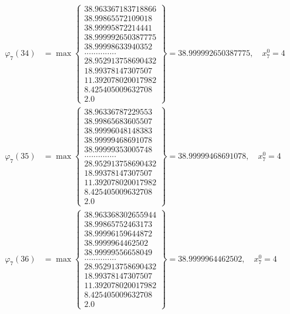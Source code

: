 \documentclass{article}
\begin{document}
\begin{align*}
  
  
  
\varphi_{7}(34) &= \max \left\{ \begin{array}{c}
38.963367183718866 \\
 38.99865572109018 \\
 38.99995872214441 \\
 38.999992650387775 \\
 38.99998633940352 \\
 .............. \\
 28.952913758690432 \\
 18.99378147307507 \\
 11.392078020017982 \\
 8.425405009632708 \\
 2.0
\end{array} \right\} = 38.999992650387775, \quad x_{7}^0 = 4\\
  
  
  
  
\varphi_{7}(35) &= \max \left\{ \begin{array}{c}
38.96336787229553 \\
 38.99865683605507 \\
 38.99996048148383 \\
 38.99999468691078 \\
 38.99999353005748 \\
 .............. \\
 28.952913758690432 \\
 18.99378147307507 \\
 11.392078020017982 \\
 8.425405009632708 \\
 2.0
\end{array} \right\} = 38.99999468691078, \quad x_{7}^0 = 4\\
  
  
  
  
\varphi_{7}(36) &= \max \left\{ \begin{array}{c}
38.963368302655944 \\
 38.99865752463173 \\
 38.99996159644872 \\
 38.9999964462502 \\
 38.99999556658049 \\
 .............. \\
 28.952913758690432 \\
 18.99378147307507 \\
 11.392078020017982 \\
 8.425405009632708 \\
 2.0
\end{array} \right\} = 38.9999964462502, \quad x_{7}^0 = 4\\
  
  
\end{align*}
\end{document}
